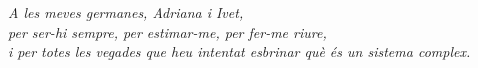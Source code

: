 \vspace*{8 cm}
\thispagestyle{empty}

\begin{flushright}
    \sffamily\Large
    \textit{
    A les meves germanes, Adriana i Ivet,\\
    per ser-hi sempre, per estimar-me, per fer-me riure, \\
    i per totes les vegades que heu intentat esbrinar què és un sistema complex.\\
    }
\end{flushright}